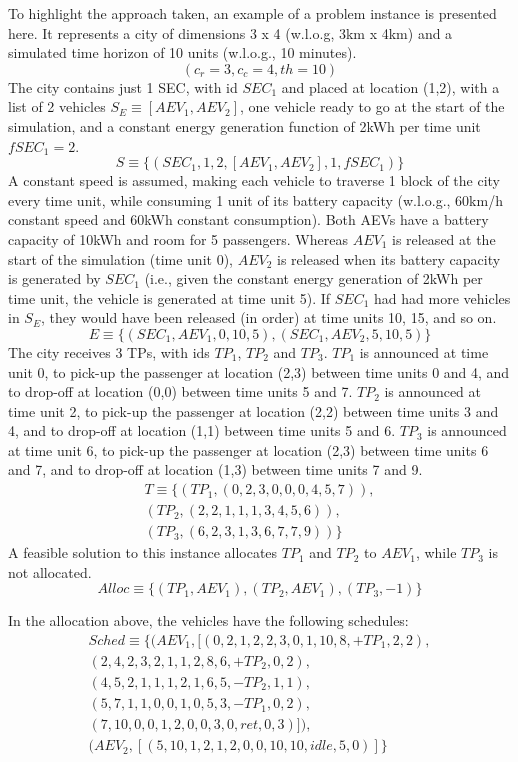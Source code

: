 To highlight the approach taken, an example of a problem instance is presented here. It represents a city of dimensions 3 x 4 (w.l.o.g, 3km x 4km) and a simulated time horizon of 10 units (w.l.o.g., 10 minutes).  
\[
( c_r = 3, c_c = 4,  th = 10 ) 
\]
The city contains just 1 SEC,  with id $SEC_1$ and placed at location (1,2),  with a list of 2 vehicles $S_E \equiv [ AEV_1, AEV_2]$, one vehicle ready to go at the start of the simulation,  and a constant energy generation function of 2kWh per time unit $fSEC_1 = 2$.
\[
 S \equiv \{ ( SEC_1, 1, 2, [AEV_1, AEV_2], 1,  fSEC_1) \}
\]
A constant speed is assumed, making each vehicle to traverse 1 block of the city every time unit, while consuming 1 unit of its battery capacity (w.l.o.g., 60km/h constant speed and 60kWh constant consumption).  
Both AEVs have a battery capacity of 10kWh and room for 5 passengers.  Whereas $AEV_1$ is released at the start of the simulation (time unit 0),  $AEV_2$ is released when its battery capacity is generated by $SEC_1$ (i.e., given the constant energy generation of 2kWh per time unit,  the vehicle is generated at time unit 5).  If $SEC_1$ had had more vehicles in $S_E$, they would have been released (in order) at time units 10, 15, and so on.
\[
E \equiv \{ ( SEC_1,  AEV_1,  0,  10,  5 ),  ( SEC_1,  AEV_2,  5,  10,  5 ) \}
\]
The city receives 3 TPs,  with ids $TP_1$,  $TP_2$ and $TP_3$. 
$TP_1$ is announced at time unit 0,  to pick-up the passenger at location (2,3) between time units 0 and 4, and to drop-off at location (0,0) between time units 5 and 7. 
$TP_2$ is announced at time unit 2,  to pick-up the passenger at location (2,2) between time units 3 and 4, and to drop-off  at location (1,1) between time units 5 and 6. 
$TP_3$ is announced at time unit 6,  to pick-up the passenger at location (2,3) between time units 6 and 7, and to drop-off  at location (1,3) between time units 7 and 9. 
\begin{align*}
T \equiv \{ (TP_1,  ( 0, 2, 3, 0, 0, 0, 4, 5, 7 )), \\
			      (TP_2, ( 2, 2, 1, 1, 1, 3, 4, 5, 6 )), \\
			      (TP_3, ( 6, 2, 3, 1, 3, 6, 7, 7, 9 )) \}		      
\end{align*}
A feasible solution to this instance allocates $TP_1$ and $TP_2$ to $AEV_1$, while $TP_3$ is not allocated.
\[
Alloc \equiv \{ (TP_1, AEV_1),  (TP_2, AEV_1),  (TP_3, -1) \}
\]

In the allocation above,  the vehicles have the following schedules: 
\begin{align*}
Sched \equiv \{ (AEV_1,  [ ( 0, 2, 1, 2, 2, 3, 0, 1, 10, 8, +TP_1, 2, 2 ), \\
									  ( 2, 4, 2, 3, 2, 1, 1, 2, 8, 6, +TP_2, 0, 2 ), \\
									  ( 4, 5, 2, 1, 1, 1, 2, 1, 6, 5, -TP_2, 1, 1 ), \\
									  ( 5, 7, 1, 1, 0, 0, 1, 0, 5, 3, -TP_1, 0, 2 ), \\									 
									  ( 7, 10, 0, 0, 1, 2, 0, 0, 3, 0, ret, 0, 3 )]),\\										 
							(AEV_2,  [ ( 5, 10, 1, 2, 1, 2, 0, 0, 10, 10, idle, 5, 0 )	] \} \\  
\end{align*}							       
	
